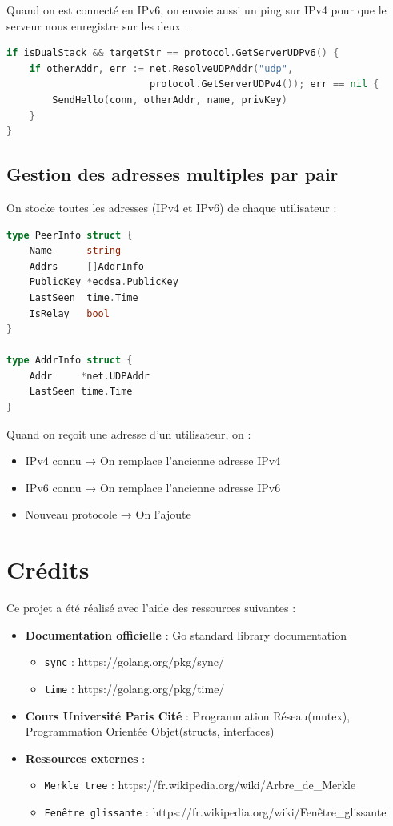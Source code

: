\documentclass[11pt,a4paper]{report}
\begin{document}
Quand on est connecté en IPv6, on envoie aussi un ping sur IPv4 pour que le serveur nous enregistre sur les deux :

\begin{lstlisting}[language=Go]
if isDualStack && targetStr == protocol.GetServerUDPv6() {
    if otherAddr, err := net.ResolveUDPAddr("udp", 
                         protocol.GetServerUDPv4()); err == nil {
        SendHello(conn, otherAddr, name, privKey)
    }
}
\end{lstlisting}

\subsection{Gestion des adresses multiples par pair}

On stocke toutes les adresses (IPv4 et IPv6) de chaque utilisateur :

\begin{lstlisting}[language=Go]
type PeerInfo struct {
    Name      string
    Addrs     []AddrInfo
    PublicKey *ecdsa.PublicKey
    LastSeen  time.Time
    IsRelay   bool
}

type AddrInfo struct {
    Addr     *net.UDPAddr
    LastSeen time.Time
}
\end{lstlisting}

Quand on reçoit une adresse d'un utilisateur, on :

\begin{itemize}
    \item IPv4 connu → On remplace l'ancienne adresse IPv4
    \item IPv6 connu → On remplace l'ancienne adresse IPv6
    \item Nouveau protocole → On l'ajoute
\end{itemize}

\section*{Crédits}

Ce projet a été réalisé avec l'aide des ressources suivantes :

\begin{itemize}
    \item \textbf{Documentation officielle} : Go standard library documentation
    \begin{itemize}
        \item \texttt{sync} : https://golang.org/pkg/sync/
        \item \texttt{time} : https://golang.org/pkg/time/
    \end{itemize}
    \item \textbf{Cours Université Paris Cité} : Programmation Réseau(mutex), Programmation Orientée Objet(structs, interfaces)
    \item \textbf{Ressources externes} : 
    \begin{itemize}
        \item \texttt{Merkle tree} : https://fr.wikipedia.org/wiki/Arbre\_de\_Merkle
        \item \texttt{Fenêtre glissante} : https://fr.wikipedia.org/wiki/Fenêtre\_glissante
    \end{itemize}
\end{itemize}
\end{document}
